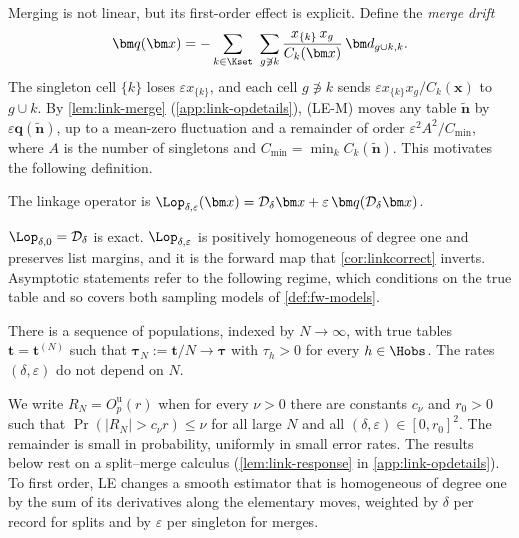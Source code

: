 Merging is not linear, but its first-order effect is explicit. Define the \emph{merge drift}
\begin{equation}\label{eq:link-q}
  \bm q(\bm x)=-\sum_{k\in\Kset}\ \sum_{g\not\ni k}\frac{x_{\{k\}}\,x_g}{C_k(\bm x)}\,\bm d_{g\cup k,k} .
\end{equation}
The singleton cell $\{k\}$ loses $\varepsilon x_{\{k\}}$, and each cell $g\not\ni k$ sends $\varepsilon x_{\{k\}}x_g/C_k(\bm x)$ to $g\cup k$. By \cref{lem:link-merge} (\cref{app:link-opdetails}), (LE-M) moves any table $\tilde{\bm n}$ by $\varepsilon\bm q(\tilde{\bm n})$, up to a mean-zero fluctuation and a remainder of order $\varepsilon^2A^2/C_{\min}$, where $A$ is the number of singletons and $C_{\min}=\min_kC_k(\tilde{\bm n})$. This motivates the following definition.

\begin{definition}\label{def:link-T}
The linkage operator is $\Lop_{\delta,\varepsilon}(\bm x)=\mathcal D_\delta\bm x+\varepsilon\,\bm q(\mathcal D_\delta\bm x)$.
\end{definition}

$\Lop_{\delta,0}=\mathcal D_\delta$ is exact. $\Lop_{\delta,\varepsilon}$ is positively homogeneous of degree one and preserves list margins, and it is the forward map that \cref{cor:linkcorrect} inverts. Asymptotic statements refer to the following regime, which conditions on the true table and so covers both sampling models of \cref{def:fw-models}.

\begin{assumption}\label{ass:link-pop}
There is a sequence of populations, indexed by $N\to\infty$, with true tables $\bm t=\bm t^{(N)}$ such that $\bm\tau_N:=\bm t/N\to\bm\tau$ with $\tau_h>0$ for every $h\in\Hobs$. The rates $(\delta,\varepsilon)$ do not depend on $N$.
\end{assumption}

We write $R_N=O_p^{\mathrm u}(r)$ when for every $\nu>0$ there are constants $c_\nu$ and $r_0>0$ such that $\Pr(|R_N|>c_\nu r)\le\nu$ for all large $N$ and all $(\delta,\varepsilon)\in[0,r_0]^2$. The remainder is small in probability, uniformly in small error rates. The results below rest on a split--merge calculus (\cref{lem:link-response} in \cref{app:link-opdetails}). To first order, LE changes a smooth estimator that is homogeneous of degree one by the sum of its derivatives along the elementary moves, weighted by $\delta$ per record for splits and by $\varepsilon$ per singleton for merges.

